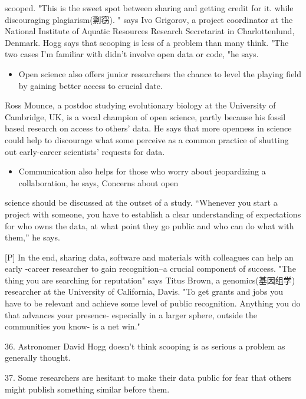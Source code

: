 \documentclass[UTF8,11pt]{ctexart}
\begin{document}
scooped. "This is the sweet spot between sharing and getting credit for it. while discouraging plagiarism(剽窃). " says Ivo Grigorov, a project coordinator at the National Institute of Aquatic Resources Research Secretariat in Charlottenlund, Denmark. Hogg says that scooping is less of a problem than many think. "The two cases I'm familiar with didn't involve open data or code, "he says.


\begin{itemize}[leftmargin=2em,itemsep=.2em,topsep=.4em]\item[N.] Open science also offers junior researchers the chance to level the playing field by gaining better access to crucial date.
\end{itemize}

Ross Mounce, a postdoc studying evolutionary biology at the University of Cambridge, UK, is a vocal champion of open science, partly because his fossil based research on access to others' data. He says that more openness in science could help to discourage what some perceive as a common practice of shutting out early-career scientists' requests for data.


\begin{itemize}[leftmargin=2em,itemsep=.2em,topsep=.4em]\item[O.] Communication also helps for those who worry about jeopardizing a collaboration, he says, Concerns about open
\end{itemize}

science should be discussed at the outset of a study. “Whenever you start a project with someone, you have to establish a clear understanding of expectations for who owns the data, at what point they go public and who can do what with them,” he says.


[P] In the end, sharing data, software and materials with colleagues can help an early -career researcher to gain recognition--a crucial component of success. "The thing you are searching for reputation" says Titus Brown, a genomics(基因组学) researcher at the University of California, Davis. "To get grants and jobs you have to be relevant and achieve some level of public recognition. Anything you do that advances your presence- especially in a larger sphere, outside the communities you know- is a net win."


36. Astronomer David Hogg doesn't think scooping is as serious a problem as generally thought.


37. Some researchers are hesitant to make their data public for fear that others might publish something similar before them.
\end{document}
